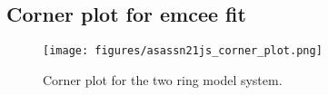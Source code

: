 \documentclass[letter]{aa} %
\begin{document}
\begin{appendix}
\clearpage
\FloatBarrier

\section{Corner plot for emcee fit}

\begin{figure}[h]
    \centering
    \texttt{[image: figures/asassn21js\_corner\_plot.png]}
    \caption{Corner plot for the two ring model system.} 
    \label{fig:two_ring_corner}
\end{figure}

\end{appendix}
\end{document}
